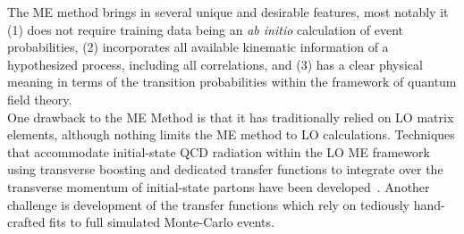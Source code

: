 
The ME method brings in several unique and desirable features, most notably it (1) does not require training data being an \emph{ab initio} calculation of event probabilities, (2) incorporates all available kinematic information of a hypothesized process, including all correlations, and (3) has a clear physical meaning in terms of the transition probabilities within the framework of quantum field theory.\\

One drawback to the ME Method is that it has traditionally relied on LO matrix elements, although nothing limits the ME method to LO calculations. Techniques that accommodate initial-state QCD radiation within the LO ME framework using transverse boosting and dedicated transfer functions to integrate over the transverse momentum of initial-state partons have been developed~\cite{Alwall:2010cq}.
Another challenge is development of the transfer functions which rely on tediously hand-crafted fits to full simulated Monte-Carlo events.\\

